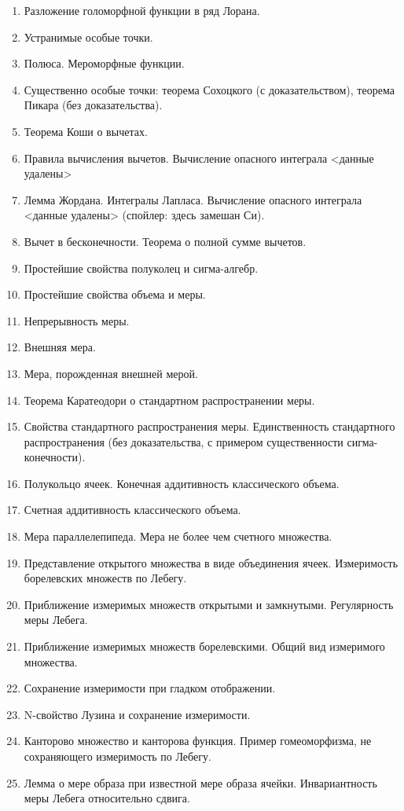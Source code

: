 \documentclass[12pt, a4paper, oneside]{memoir}
\begin{document}
\begin{enumerate}
\item Разложение голоморфной функции в ряд Лорана.
\item Устранимые особые точки.
\item Полюса. Мероморфные функции.
\item Существенно особые точки: теорема Сохоцкого (с доказательством), теорема Пикара (без доказательства).
\item Теорема Коши о вычетах.
\item Правила вычисления вычетов. Вычисление опасного интеграла <данные удалены>
\item Лемма Жордана. Интегралы Лапласа. Вычисление опасного интеграла <данные удалены> (спойлер: здесь замешан Си).
\item Вычет в бесконечности. Теорема о полной сумме вычетов.
\item Простейшие свойства полуколец и сигма-алгебр.
\item Простейшие свойства объема и меры.
\item Непрерывность меры.
\item Внешняя мера.
\item Мера, порожденная внешней мерой.
\item Теорема Каратеодори о стандартном распространении меры.
\item Свойства стандартного распространения меры. Единственность стандартного распространения (без доказательства, с примером существенности сигма-конечности).
\item Полукольцо ячеек. Конечная аддитивность классического объема.
\item Счетная аддитивность классического объема.
\item Мера параллелепипеда. Мера не более чем счетного множества.
\item Представление открытого множества в виде объединения ячеек. Измеримость борелевских множеств по Лебегу.
\item Приближение измеримых множеств открытыми и замкнутыми. Регулярность меры Лебега.
\item Приближение измеримых множеств борелевскими. Общий вид измеримого множества.
\item Сохранение измеримости при гладком отображении.
\item N-свойство Лузина и сохранение измеримости.
\item Канторово множество и канторова функция. Пример гомеоморфизма, не сохраняющего измеримость по Лебегу.
\item Лемма о мере образа при известной мере образа ячейки. Инвариантность меры Лебега относительно сдвига.

\end{enumerate}
\end{document}
